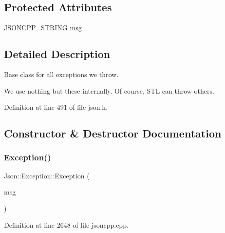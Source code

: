 \subsection*{Protected Attributes}
\begin{DoxyCompactItemize}
\item 
\hyperlink{config_8h_a1e723f95759de062585bc4a8fd3fa4be}{J\+S\+O\+N\+C\+P\+P\+\_\+\+S\+T\+R\+I\+NG} \hyperlink{class_json_1_1_exception_aae3cbb8b45bf21480f64502a8329659f}{msg\+\_\+}
\end{DoxyCompactItemize}


\subsection{Detailed Description}
Base class for all exceptions we throw.

We use nothing but these internally. Of course, S\+TL can throw others. 

Definition at line 491 of file json.\+h.



\subsection{Constructor \& Destructor Documentation}
\hypertarget{class_json_1_1_exception_ae764aa42e0755bd4ce9d303e2733fa8f}{}\label{class_json_1_1_exception_ae764aa42e0755bd4ce9d303e2733fa8f} 
\subsubsection{\texorpdfstring{Exception()}{Exception()}\hspace{0.1cm}{\footnotesize\ttfamily [1/2]}}
{\footnotesize\ttfamily Json\+::\+Exception\+::\+Exception (\begin{DoxyParamCaption}\item[{\hyperlink{config_8h_a1e723f95759de062585bc4a8fd3fa4be}{J\+S\+O\+N\+C\+P\+P\+\_\+\+S\+T\+R\+I\+NG} const \&}]{msg }\end{DoxyParamCaption})}



Definition at line 2648 of file jsoncpp.\+cpp.

\hypertarget{class_json_1_1_exception_add6af5e0ecdf36f40d7f3554b9786e21}{}\label{class_json_1_1_exception_add6af5e0ecdf36f40d7f3554b9786e21} 
